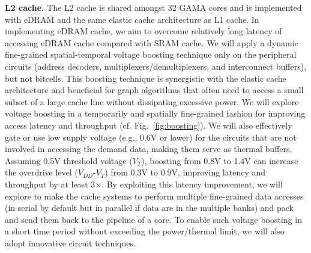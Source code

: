 \noindent
\textbf{L2 cache.}
The L2 cache is shared amongst 32 GAMA cores and is implemented with eDRAM and the same elastic cache architecture as L1 cache. 
In implementing eDRAM cache, we aim to overcome relatively long latency of accessing eDRAM cache compared with SRAM cache. 
We will apply a dynamic fine-grained spatial-temporal voltage boosting technique only on the peripheral circuits (address decoders, multiplexers/demultiplexers, and interconnect buffers), but not bitcells. 
This boosting technique is synergistic with the elastic cache architecture and beneficial for graph algorithms that often need to access a small subset of a large cache line without dissipating excessive power. 
We will explore voltage boosting in a temporarily and spatially fine-grained fashion for improving access latency and throughput (cf. Fig.~\ref{fig:boosting}). 
We will also effectively gate or use low supply voltage (e.g., 0.6V or lower) for the circuits that are not involved in accessing the demand data, making them serve as thermal buffers. 
Assuming 0.5V threshold voltage ($V_T$), 
boosting from 0.8V to 1.4V can increase the overdrive level ($V_{DD}$-$V_T$) from 0.3V to 0.9V, improving latency and throughput by at least 3$\times$. 
By exploiting this latency improvement, we will explore to make the cache systems to perform multiple fine-grained data accesses (in serial by default but in parallel if data are in the multiple banks) and pack and send them back to the pipeline of a core. 
To enable such voltage boosting in a short time period without exceeding the power/thermal limit, 
we will also adopt innovative circuit techniques.


